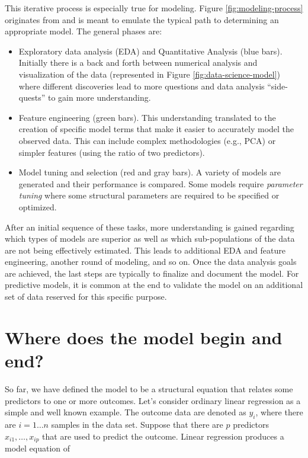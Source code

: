\documentclass[11pt]{book}
\begin{document}
This iterative process is especially true for modeling. Figure \ref{fig:modeling-process} originates from \citet{kuhn20202} and is meant to emulate the typical path to determining an appropriate model. The general phases are:

\begin{itemize}
\item
  Exploratory data analysis (EDA) and Quantitative Analysis (blue bars). Initially there is a back and forth between numerical analysis and visualization of the data (represented in Figure \ref{fig:data-science-model}) where different discoveries lead to more questions and data analysis ``side-quests'' to gain more understanding.
\item
  Feature engineering (green bars). This understanding translated to the creation of specific model terms that make it easier to accurately model the observed data. This can include complex methodologies (e.g., PCA) or simpler features (using the ratio of two predictors).
\item
  Model tuning and selection (red and gray bars). A variety of models are generated and their performance is compared. Some models require \emph{parameter tuning} where some structural parameters are required to be specified or optimized.
\end{itemize}

After an initial sequence of these tasks, more understanding is gained regarding which types of models are superior as well as which sub-populations of the data are not being effectively estimated. This leads to additional EDA and feature engineering, another round of modeling, and so on. Once the data analysis goals are achieved, the last steps are typically to finalize and document the model. For predictive models, it is common at the end to validate the model on an additional set of data reserved for this specific purpose.

\hypertarget{begin-model-end}{%
\section{Where does the model begin and end?}\label{begin-model-end}}

So far, we have defined the model to be a structural equation that relates some predictors to one or more outcomes. Let's consider ordinary linear regression as a simple and well known example. The outcome data are denoted as \(y_i\), where there are \(i = 1 \ldots n\) samples in the data set. Suppose that there are \(p\) predictors \(x_{i1}, \ldots, x_{ip}\) that are used to predict the outcome. Linear regression produces a model equation of
\end{document}
